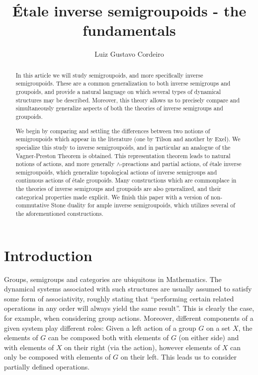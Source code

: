 \documentclass[a4paper]{amsart}
\title{Étale inverse semigroupoids - the fundamentals}
\author{Luiz Gustavo Cordeiro%
}
\theoremstyle{plain}    \newtheorem{theorem}[generalnumbering]{Theorem}
\theoremstyle{plain}    \newtheorem{corollary}[generalnumbering]{Corollary}
\theoremstyle{definition}   \newtheorem{definition}[generalnumbering]{Definition}
\theoremstyle{definition}   \newtheorem{example}[generalnumbering]{Example}
\theoremstyle{plain}    \newtheorem{proposition}[generalnumbering]{Proposition}
\theoremstyle{plain}    \newtheorem{lemma}[generalnumbering]{Lemma}
\theoremstyle{plain}    \newtheorem{plainstyle}[generalnumbering]{\namefordifferentenvironment}
\theoremstyle{plain}    \newtheorem*{plainstyle*}{\namefordifferentenvironment}
\theoremstyle{definition}    \newtheorem{definitionstyle}[generalnumbering]{\namefordifferentenvironment}
\theoremstyle{definition}    \newtheorem*{definitionstyle*}{\namefordifferentenvironment}
\begin{document}

\begin{abstract}
    In this article we will study semigroupoids, and more specifically inverse semigroupoids. These are a common generalization to both inverse semigroups and groupoids, and provide a natural language on which several types of dynamical structures may be described. Moreover, this theory allows us to precisely compare and simultaneously generalize aspects of both the theories of inverse semigroups and groupoids.
    
    We begin by comparing and settling the differences between two notions of semigroupoids which appear in the literature (one by Tilson and another by Exel). We specialize this study to inverse semigroupoids, and in particular an analogue of the Vagner-Preston Theorem is obtained. This representation theorem leads to natural notions of actions, and more generally $\land$-preactions and partial actions, of étale inverse semigroupoids, which generalize topological actions of inverse semigroups and continuous actions of étale groupoids. Many constructions which are commonplace in the theories of inverse semigroups and groupoids are also generalized, and their categorical properties made explicit. We finish this paper with a version of non-commutative Stone duality for ample inverse semigroupoids, which utilizes several of the aforementioned constructions.
\end{abstract}

\maketitle

\section{Introduction}

Groups, semigroups and categories are ubiquitous in Mathematics. The dynamical systems associated with such structures are usually assumed to satisfy some form of associativity, roughly stating that ``performing certain related operations in any order will always yield the same result''. This is clearly the case, for example, when considering group actions. Moreover, different components of a given system play different roles: Given a left action of a group $G$ on a set $X$, the elements of $G$ can be composed both with elements of $G$ (on either side) and with elements of $X$ on their right (via the action), however elements of $X$ can only be composed with elements of $G$ on their left. This leads us to consider partially defined operations.
\end{document}
